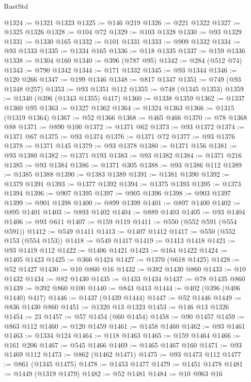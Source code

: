 \begin{lexlean}{RustStd}
\begin{coremodule}
@1324 := @1321 @1323
@1325 := @146 @219
@1326 := @221 @1322
@1327 := @1325 @1326
@1328 := @104 @72
@1329 := @103 @1328
@1330 := @93 @1329
@1331 := @1330 @165
@1332 := @101 @1331
@1333 := @909 @1332
@1334 := @93 @1333
@1335 := @1334 @165
@1336 := @118 @1335
@1337 := @159 @1336
@1338 := @1304 @160
@1340 := @396 (@787 @95)
@1342 := @284 (@512 @74)
@1343 := @790 @1342
@1344 := @171 @1332
@1345 := @93 @1344
@1346 := @120 @266
@1347 := @199 @1346
@1348 := @817 @1347
@1351 := @749 (@93 @1348 @257)
@1353 := @93 @1351 @112
@1355 := @748 (@1345 @1353)
@1359 := @1340 (@396 (@1343 @1355) @417)
@1360 := @1338 @1359
@1362 := @1337 @1360 @95
@1363 := @1327 @1362
@1364 := @1324 @1363
@1366 := @1315 (@1319 @1364)
@1367 := @52 @1366
@1368 := @465 @466
@1370 := @78 @1368 @88
@1371 := @890 @100
@1372 := @1371 @62
@1373 := @93 @1372
@1374 := @1371 @67
@1375 := @93 @1374
@1376 := @1371 @72
@1377 := @93 @1376
@1378 := @1371 @145
@1379 := @93 @1378
@1380 := @1371 @156
@1381 := @93 @1380
@1382 := @1371 @193
@1383 := @93 @1382
@1384 := @1371 @216
@1385 := @93 @1384
@1386 := @1371 @305
@1388 := @93 @1386 @112
@1389 := @1385 @1388
@1390 := @1383 @1389
@1391 := @1381 @1390
@1392 := @1379 @1391
@1393 := @1377 @1392
@1394 := @1375 @1393
@1395 := @1373 @1394
@1396 := @907 @1395
@1397 := @905 @1396
@1398 := @903 @1397
@1399 := @901 @1398
@1400 := @899 @1399
@1401 := @897 @1400
@1402 := @895 @1401
@1403 := @893 @1402
@1404 := @889 @1403
@1405 := @93 @1404
@1406 := @93 @611
@1407 := @159 @119
@1411 := @550 (@552 @591 (@554 @591))
@1412 := @549 @1411
@1413 := @1407 @1412
@1417 := @550 (@552 @153 (@554 @153))
@1418 := @549 @1417
@1419 := @1413 @1418
@1421 := @93 @1419 @112
@1422 := @1406 @1421
@1423 := @164 @1422
@1424 := @1405 @1423
@1425 := @366 @1424
@1427 := @1370 (@618 @1425)
@1428 := @52 @1427
@1430 := @10 @860 @16
@1432 := @382 @1430 @860
@1433 := @10 @1432
@1434 := @82 @1430
@1435 := @1433 @1434
@1437 := @78 @1435 @860
@1439 := @392 @860 @100
@1440 := @843 @413
@1444 := @402 (@396 (@406 @1440) @417)
@1446 := @1437 (@1439 @1444)
@1447 := @52 @1446
@1449 := @836 @1430 @860
@1451 := @1320 @13 @1323
@1453 := @146 @13 @1326
@1454 := 23
@1457 := @57 @1454 (@60 @1454)
@1458 := @90 @1457
@1459 := @863 @112
@1460 := @120 @1459
@1461 := @1458 @1460
@1462 := @93 @1461
@1463 := @1334 @124
@1464 := @118 @1463
@1465 := @159 @1464
@1466 := @161 @206
@1467 := @545 @1466
@1469 := @1465 @1467 @160
@1471 := @93 @1469 @112
@1473 := @862 (@1462 @1471)
@1475 := @93 @1473 @112
@1477 := @861 (@1345 @1475)
@1478 := @1453 @1477
@1479 := @1451 @1478
@1481 := @1449 (@1319 @1479)
@1482 := @52 @1481
@1484 := @10 @963 @16

\end{coremodule}
\end{lexlean}
